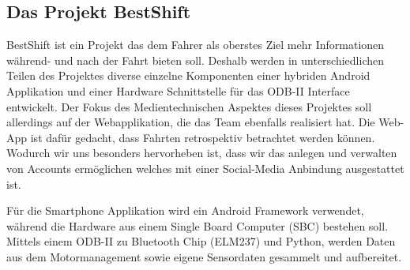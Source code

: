 \subsection{Das Projekt BestShift}

BestShift ist ein Projekt das dem Fahrer als oberstes Ziel mehr Informationen während- und nach der Fahrt bieten soll. 
Deshalb werden in unterschiedlichen Teilen des Projektes 
diverse einzelne Komponenten einer hybriden Android Applikation und einer Hardware Schnittstelle für das ODB-II 
Interface entwickelt. Der Fokus des Medientechnischen Aspektes dieses Projektes soll allerdings auf der Webapplikation, die das Team ebenfalls realisiert hat. 
Die Web-App ist dafür gedacht, dass Fahrten retrospektiv betrachtet werden können.
Wodurch wir uns besonders hervorheben ist, dass wir das anlegen und verwalten von Accounts ermöglichen welches mit einer Social-Media Anbindung ausgestattet ist.
 

Für die Smartphone Applikation wird ein Android Framework verwendet, 
während die Hardware aus einem Single Board Computer (SBC) bestehen soll. 
Mittels einem ODB-II zu Bluetooth Chip (ELM237) und Python, 
werden Daten aus dem Motormanagement sowie eigene Sensordaten gesammelt und aufbereitet. 

\clearpage %